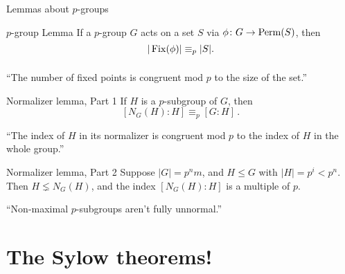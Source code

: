\documentclass[8pt, handout]{beamer}
\newcommand{\Pause}{\pause}      %
\begin{document}
\begin{frame}{Lemmas about $p$-groups}

  \begin{block}{$p$-group Lemma}
    If a $p$-group $G$ acts on a set $S$ via $\phi\colon
    G\to\operatorname{Perm}(S)$, then
    \[
    |\operatorname{Fix}(\phi)|\equiv_p|S|.
    \]
    $\;$\vspace{-5mm}
  \end{block}

  \medskip

  ``The number of fixed points is congruent mod $p$ to the size of the set.''

  \medskip

  \begin{block}{Normalizer lemma, Part 1}
    If $H$ is a $p$-subgroup of $G$, then \vspace{-1mm}
    \[
    [N_G(H)\colon H]\equiv_p[G\colon H]\,.
    \]
    $\;$\vspace{-0.4cm}
  \end{block}

  \medskip

  ``The index of $H$ in its normalizer is congruent mod $p$ to the index of $H$ in the whole group.''

  \medskip

  \begin{block}{Normalizer lemma, Part 2} 
    Suppose $|G|=p^nm$, and $H\leq G$ with $|H|=p^i<p^n$. Then $H\lneq
    N_G(H)$, and the index $[N_G(H):H]$ is a multiple of $p$. \Pause
  \end{block}

  \medskip

  ``Non-maximal $p$-subgroups aren't fully unnormal.''

  \medskip
  
\end{frame}


\section{The Sylow theorems!}

\end{document}

